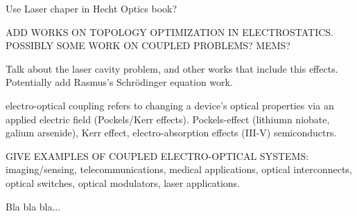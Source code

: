 Use Laser chaper in Hecht Optics book?

ADD WORKS ON TOPOLOGY OPTIMIZATION IN ELECTROSTATICS. POSSIBLY SOME WORK
ON COUPLED PROBLEMS? MEMS?

Talk about the laser cavity problem, and other works that include this effects.
Potentially add Rasmus's Schrödinger equation work.

electro-optical coupling refers to changing a device’s optical properties via an applied electric field (Pockels/Kerr effects). Pockels-effect (lithiumn niobate, galium arsenide), Kerr effect, electro-absorption effects (III-V) semiconductrs.


GIVE EXAMPLES OF COUPLED ELECTRO-OPTICAL SYSTEMS: imaging/sensing, telecommunications,
medical applications, optical interconnects, optical switches, optical modulators,
laser applications.

Bla bla bla...